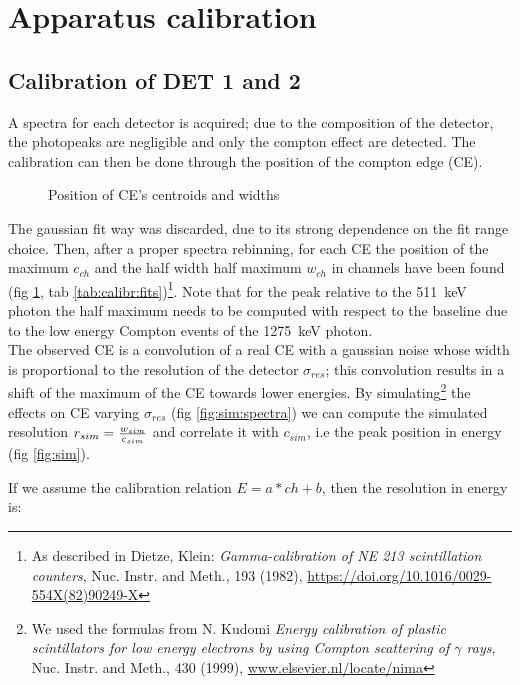 \documentclass[11pt,a4 paper]{article}
\let\oldfrac\frac
\renewcommand{\frac}[3][d]{\ifthenelse{\equal{#1}{d}}{\oldfrac{#2}{#3}}{\nicefrac{#2}{#3}}}
\begin{document}
\section{Apparatus calibration}

\subsection{Calibration of DET 1 and 2}
A spectra for each detector is acquired; due to the composition of the detector, the photopeaks are negligible and only the compton effect are detected. The calibration can then be done through the position of the compton edge (CE).

\begin{figure}[H]
    \centering
    \caption{Position of CE's centroids and widths}
    \label{fig:det1:calibr}
\end{figure}

The gaussian fit way was discarded, due to its strong dependence on the fit range choice. Then, after a proper spectra rebinning, for each CE the position of the maximum $c_{ch}$ and the half width half maximum $w_{ch}$ in channels have been found (fig \ref{fig:det1:calibr}, tab \ref{tab:calibr:fits})\footnote{As described in Dietze, Klein: \emph{Gamma-calibration of NE 213 scintillation counters}, Nuc. Instr. and Meth., 193 (1982), \url{https://doi.org/10.1016/0029-554X(82)90249-X}}.
Note that for the peak relative to the \SI{511}{\kilo\electronvolt} photon the half maximum needs to be computed with respect to the baseline due to the low energy Compton events of the \SI{1275}{\kilo\electronvolt} photon.\\
The observed CE is a convolution of a real CE with a gaussian noise whose width is proportional to the resolution of the detector $\sigma_{res}$; this convolution results in a shift of the maximum of the CE towards lower energies. By simulating\footnote{We used the formulas from N. Kudomi \emph{Energy calibration of plastic scintillators for low energy electrons by using Compton scattering of $\gamma$ rays}, Nuc. Instr. and Meth., 430 (1999), \url{www.elsevier.nl/locate/nima}} the effects on CE varying $\sigma_{res}$ (fig \ref{fig:sim:spectra}) we can compute the simulated resolution $r_{sim} = \frac{w_{sim}}{c_{sim}}$ and correlate it with $c_{sim}$, i.e the peak position in energy (fig \ref{fig:sim}).

If we assume the calibration relation $E = a*ch + b$, then the resolution in energy is:
\end{document}
